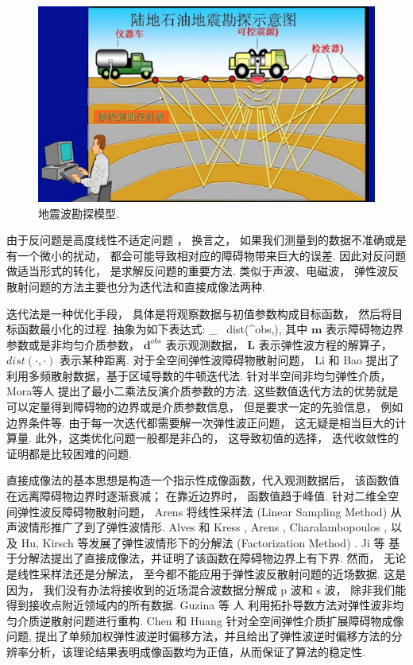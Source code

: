 \begin{figure}[htbp]
	\centering
	\includegraphics[width=\textwidth]{./Img/seismic2}
	\caption{地震波勘探模型.} \label{figure_seismic}
\end{figure}


由于反问题是高度线性不适定问题 \cite{hadamard1923lectures}， 换言之， 如果我们测量到的数据不准确或是有一个微小的扰动， 都会可能导致相对应的障碍物带来巨大的误差. 因此对反问题做适当形式的转化， 是求解反问题的重要方法. 类似于声波、电磁波， 弹性波反散射问题的方法主要也分为迭代法和直接成像法两种.  

迭代法是一种优化手段， 具体是将观察数据与初值参数构成目标函数， 然后将目标函数最小化的过程.  抽象为如下表达式:
\ben
\min_{} \ dist(^{obs},),
\een
其中 $\mathbf m$ 表示障碍物边界参数或是非均匀介质参数， $\mathbf{d}^{obs}$ 表示观测数据， $\mathbf{{L}}$ 表示弹性波方程的解算子， $dist(\cdot,\cdot)$ 表示某种距离. 
对于全空间弹性波障碍物散射问题， Li \cite{li2016inverse} 和 Bao \cite{bao2018direct} 提出了利用多频散射数据，基于区域导数的牛顿迭代法.  针对半空间非均匀弹性介质， Mora等人 \cite{mora1987nonlinear,feng2017elastic,elita2018elastic} 提出了最小二乘法反演介质参数的方法.  这些数值迭代方法的优势就是可以定量得到障碍物的边界或是介质参数信息， 但是要求一定的先验信息， 例如边界条件等.  由于每一次迭代都需要解一次弹性波正问题， 这无疑是相当巨大的计算量.  此外，这类优化问题一般都是非凸的， 这导致初值的选择， 迭代收敛性的证明都是比较困难的问题.  

直接成像法的基本思想是构造一个指示性成像函数，代入观测数据后， 该函数值在远离障碍物边界时逐渐衰减； 在靠近边界时， 函数值趋于峰值. 针对二维全空间弹性波反障碍物散射问题， Arens \cite{arens2001linear} 将线性采样法 (Linear Sampling Method) 从声波情形推广了到了弹性波情形.   Alves 和 Kress \cite{alves2002far}, Arens \cite{arens2001linear}, Charalambopoulos \cite{charalambopoulos2006factorization}, 以及  Hu, Kirsch \cite{hu2012some} 等发展了弹性波情形下的分解法 (Factorization Method) .  Ji 等 \cite{ji2018direct} 基于分解法提出了直接成像法，并证明了该函数在障碍物边界上有下界.  然而， 无论是线性采样法还是分解法， 至今都不能应用于弹性波反散射问题的近场数据. 这是因为， 我们没有办法将接收到的近场混合波数据分解成 p 波和 s 波， 除非我们能得到接收点附近领域内的所有数据.  Guzina 等
人 \cite{gintides2012identification} 利用拓扑导数方法对弹性波非均匀介质逆散射问题进行重构.  Chen 和 Huang \cite{ela_reverse} 针对全空间弹性介质扩展障碍物成像问题, 提出了单频加权弹性波逆时偏移方法，并且给出了弹性波逆时偏移方法的分辨率分析，该理论结果表明成像函数均为正值，从而保证了算法的稳定性. 


